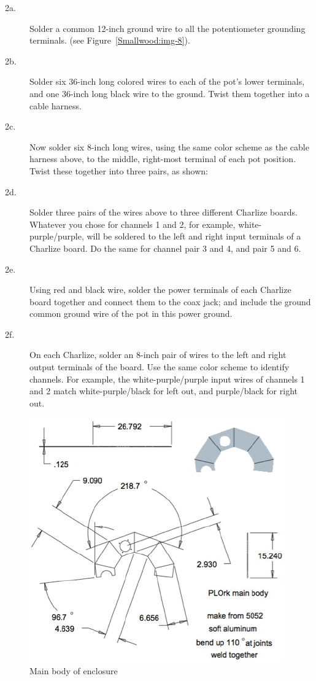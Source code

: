 \begin{description}
	\item[2a.] Solder a common 12-inch ground wire to all the potentiometer grounding
terminals. (see Figure~\ref{Smallwood:img-8}).
	\item[2b.] Solder six 36-inch long colored wires to each of the pot's lower terminals,
and one 36-inch long black wire to the ground. Twist them together into a cable
harness.
	\item[2c.] Now solder six 8-inch long wires, using the same color scheme as the cable
harness above, to the middle, right-most terminal of each pot position. Twist
these together into three pairs, as shown:
	\item[2d.] Solder three pairs of the wires above to three different Charlize boards.
Whatever you chose for channels 1 and 2, for example, white-purple/purple, will
be soldered to the left and right input terminals of a Charlize board. Do the
same for channel pair 3 and 4, and pair 5 and 6.
	\item[2e.] Using red and black wire, solder the power terminals of each Charlize board
together and connect them to the coax jack; and include the ground common ground
wire of the pot in this power ground.
	\item[2f.] On each Charlize, solder an 8-inch pair of wires to the left and right
output terminals of the board. Use the same color scheme to identify channels.
For example, the white-purple/purple input wires of channels 1 and 2 match
white-purple/black for left out, and purple/black for right out.

\end{description}

\begin{figure}[t]
\centering
\includegraphics[width=\textwidth]{img-6-eps-converted-to-crop.pdf}
\caption{Main body of enclosure}
\label{Smallwood:img-6}
\end{figure}


